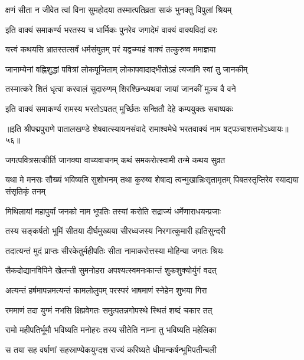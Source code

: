\twolineshloka
{क्षणं सीता न जीवेत त्वां विना सुमहोदया}
{तस्मात्पतिव्रता साकं भुनक्तु विपुलां श्रियम्}%

\twolineshloka
{इति वाक्यं समाकर्ण्य भरतस्य च धार्मिकः}
{पुनरेव जगादेमं वाक्यं वाक्यविदां वरः}%

\twolineshloka
{यत्त्वं कथयसि भ्रातस्तत्सर्वं धर्मसंयुतम्}
{परं यद्वच्म्यहं वाक्यं तत्कुरुष्व ममाज्ञया}%

\twolineshloka
{जानाम्येनां वह्निशुद्धां पवित्रां लोकपूजिताम्}
{लोकापवादाद्भीतोऽहं त्यजामि स्वां तु जानकीम्}%

\twolineshloka
{तस्मात्करे शितं धृत्वा करवालं सुदारुणम्}
{शिरश्छिन्ध्यथवा जायां जानकीं मुञ्च वै वने}%

\twolineshloka
{इति वाक्यं समाकर्ण्य रामस्य भरतोऽपतत्}
{मूर्च्छितः सन्क्षितौ देहे कम्पयुक्तः सबाष्पकः}%

{॥इति श्रीपद्मपुराणे पातालखण्डे शेषवात्स्यायनसंवादे रामाश्वमेधे भरतवाक्यं नाम षट्पञ्चाशत्तमोऽध्यायः॥५६॥}



\twolineshloka
{जगत्पवित्रसत्कीर्ति जानक्या वाच्यवाचनम्}
{कथं समकरोत्स्वामी तन्मे कथय सुव्रत}%


\threelineshloka
{यथा मे मनसः सौख्यं भविष्यति सुशोभनम्}
{तथा कुरुष्व शेषाद्य त्वन्मुखान्निःसृतामृतम्}
{पिबतस्तृप्तिरेव स्याद्यया संसृतिकृं तनम्}%


\twolineshloka
{मिथिलायां महापुर्यां जनको नाम भूपतिः}
{तस्यां करोति सद्राज्यं धर्मेणाराधयन्प्रजाः}%

\twolineshloka
{तस्य सङ्कर्षतो भूमिं सीतया दीर्घमुख्यया}
{सीरध्वजस्य निरगात्कुमारी ह्यतिसुन्दरी}%

\twolineshloka
{तदात्यन्तं मुदं प्राप्तः सीरकेतुर्महीपतिः}
{सीता नामाकरोत्तस्या मोहिन्या जगतः श्रियः}%

\twolineshloka
{सैकदोद्यानविपिने खेलन्ती सुमनोहरा}
{अपश्यत्स्वमनःकान्तं शुकशुक्योर्युगं वदत्}%

\twolineshloka
{अत्यन्तं हर्षमापन्नमत्यन्तं कामलोलुपम्}
{परस्परं भाषमाणं स्नेहेन शुभया गिरा}%

\twolineshloka
{रममाणं तदा युग्मं नभसि क्षिप्रवेगतः}
{समुत्पतन्नगोपस्थे स्थितं शब्दं चकार तत्}%

\twolineshloka
{रामो महीपतिर्भूमौ भविष्यति मनोहरः}
{तस्य सीतेति नाम्ना तु भविष्यति महेलिका}%

\twolineshloka
{स तया सह वर्षाणां सहस्राण्येकयुग्दश}
{राज्यं करिष्यते धीमान्कर्षन्भूमिपतीन्बली}%

